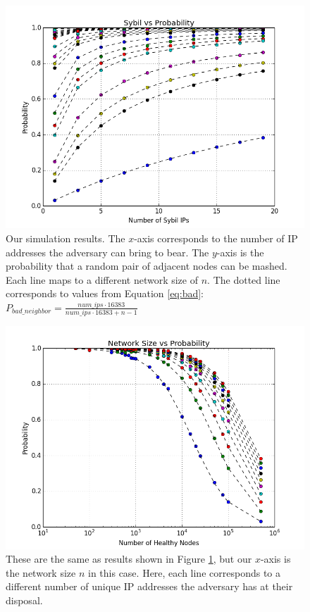 \documentclass[11pt,conference]{IEEEtran}
\begin{document}
\begin{figure}
\centering
\includegraphics[width=1\linewidth]{ip_prob_all}
\caption[foo]{Our simulation results.  
    The $x$-axis corresponds to the number of IP addresses the adversary can bring to bear.
    The $y$-axis is the probability that a random pair of adjacent nodes can be mashed.
    Each line maps to a different network size of $n$.
    The dotted line corresponds to values from Equation \ref{eq:bad}: $ P_{bad\_neighbor} =  \frac{num\_ips \cdot 16383}{num\_ips \cdot 16383 + n - 1}$}
\label{fig:exp2}
\end{figure}


\begin{figure}
\centering
\includegraphics[width=\linewidth]{size_prob_all}
\caption[a]{These are the same as results shown in Figure \ref{fig:exp2}, but our $x$-axis is the network size $n$ in this case.  
    Here, each line corresponds to a different number of unique IP addresses the adversary has at their disposal.}
\label{fig:size_prob_all}
\end{figure}
\end{document}
